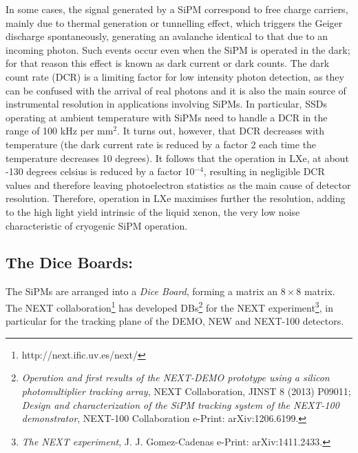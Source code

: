 \documentclass[a4paper,11pt,oneside]{article}
\begin{document}
In some cases, the signal generated by a SiPM correspond to free charge carriers, mainly due to thermal generation or tunnelling effect, which triggers the Geiger discharge spontaneously, generating an avalanche identical to that due to an incoming photon. Such events occur even when the SiPM is operated in the dark; for that reason this effect is known as dark current or dark counts. The dark count rate (DCR) is a limiting factor for low intensity photon detection, as they can be confused with the arrival of real photons and it is also the main source of instrumental resolution in applications involving SiPMs. In particular, SSDs operating at ambient temperature with SiPMs need to handle a DCR in the range of 100 kHz per mm$^2$. It turns out, however, that DCR decreases with temperature (the dark current rate is reduced by a factor 2 each time the temperature decreases 10 degrees). It follows that the operation in LXe, at about -130 degrees celsius is reduced by a factor 10$^{-4}$, resulting in negligible DCR values and therefore leaving photoelectron statistics as the main cause  of detector resolution. Therefore, operation in LXe maximises further the resolution, adding to the high light yield intrinsic of the liquid xenon, the very low noise characteristic of cryogenic SiPM operation. 

\subsection{The Dice Boards:}
\label{sec.dc}


The SiPMs are arranged into a {\em Dice Board}, forming a matrix an $8 \times 8$ matrix.
The NEXT collaboration\footnote{http://next.ific.uv.es/next/} has developed DBs\footnote{{\em
Operation and first results of the NEXT-DEMO prototype using a silicon photomultiplier tracking array}, 
NEXT Collaboration, JINST 8 (2013) P09011; {\em	
Design and characterization of the SiPM tracking system of the NEXT-100 demonstrator}, 
NEXT-100 Collaboration 
e-Print: arXiv:1206.6199. } for the NEXT experiment\footnote{
{\em The NEXT experiment},
J. J. Gomez-Cadenas e-Print: arXiv:1411.2433. }, in particular for the tracking plane of the DEMO, NEW and NEXT-100 detectors. 
\end{document}

